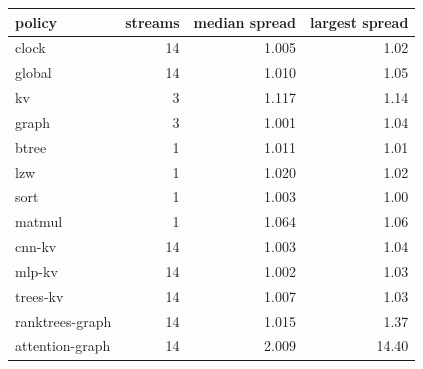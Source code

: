 \begin{tabular}{lrrr}
\toprule
policy & streams & median spread & largest spread \\
\midrule
clock & 14 & 1.005 & 1.02 \\
global & 14 & 1.010 & 1.05 \\
kv & 3 & 1.117 & 1.14 \\
graph & 3 & 1.001 & 1.04 \\
btree & 1 & 1.011 & 1.01 \\
lzw & 1 & 1.020 & 1.02 \\
sort & 1 & 1.003 & 1.00 \\
matmul & 1 & 1.064 & 1.06 \\
cnn-kv & 14 & 1.003 & 1.04 \\
mlp-kv & 14 & 1.002 & 1.03 \\
trees-kv & 14 & 1.007 & 1.03 \\
ranktrees-graph & 14 & 1.015 & 1.37 \\
attention-graph & 14 & 2.009 & 14.40 \\
\bottomrule
\end{tabular}
